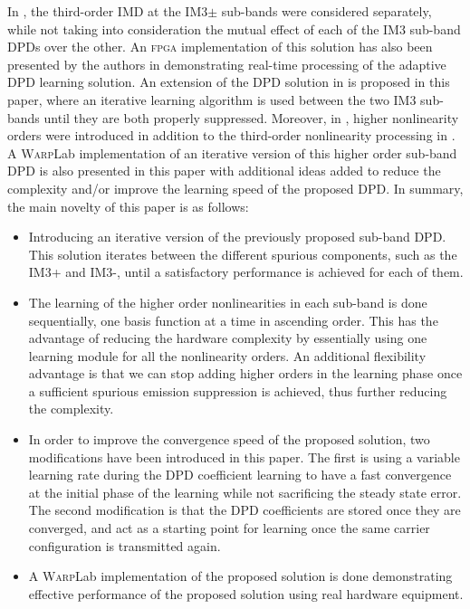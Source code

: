 In \cite{ICASSP2014}, the third-order IMD at the IM3$\pm$ sub-bands were considered separately, while not taking into consideration the mutual effect of each of the IM3 sub-band DPDs over the other. An \textsc{fpga} implementation of this solution has also been presented by the authors in \cite{Asilomar2015} demonstrating real-time processing of the adaptive DPD learning solution.
An extension of the DPD solution in \cite{ICASSP2014,Asilomar2015} is proposed in this paper, where an iterative learning algorithm is used between the two IM3 sub-bands until they are both properly suppressed. 
Moreover, in \cite{TMTT_SubbandDPD}, higher nonlinearity orders were introduced in addition to the third-order nonlinearity processing in \cite{ICASSP2014,Asilomar2015}.
A \textsc{Warp}Lab implementation of an iterative version of this higher order sub-band DPD is also presented in this paper with additional ideas added to reduce the complexity and/or improve the learning speed of the proposed DPD. In summary, the main novelty of this paper is as follows:
\begin{itemize}
	\item Introducing an iterative version of the previously proposed sub-band DPD. This solution iterates between the different spurious components, such as the IM3+ and IM3-, until a satisfactory performance is achieved for each of them.
	\item The learning of the higher order nonlinearities in each sub-band is done sequentially, one basis function at a time in ascending order. This has the advantage of reducing the hardware complexity by essentially using one learning module for all the nonlinearity orders. An additional flexibility advantage is that we can stop adding higher orders in the learning phase once a sufficient spurious emission suppression is achieved, thus further reducing the complexity.
	\item In order to improve the convergence speed of the proposed solution, two modifications have been introduced in this paper. The first is using a variable learning rate during the DPD coefficient learning to have a fast convergence at the initial phase of the learning while not sacrificing the steady state error. The second modification is that the DPD coefficients are stored once they are converged, and act as a starting point for learning once the same carrier configuration is transmitted again.
	\item A \textsc{Warp}Lab implementation of the proposed solution is done demonstrating effective performance of the proposed solution using real hardware equipment. 
\end{itemize}

